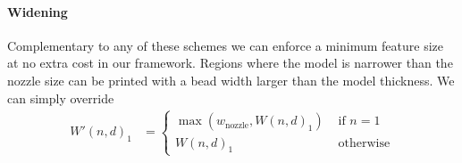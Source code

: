 \paragraph{Widening}
Complementary to any of these schemes we can enforce a minimum feature size at no extra cost in our framework.
Regions where the model is narrower than the nozzle size can be printed with a bead width larger than the model thickness.
We can simply override
\begin{align*}
W'(n,d)_1 &=
\begin{cases}
\max \left( w_\text{nozzle}  ,  W(n,d)_1 \right) & \text{ if } n = 1 \\
W(n,d)_1 & \text{ otherwise}
\end{cases}
\end{align*}




















